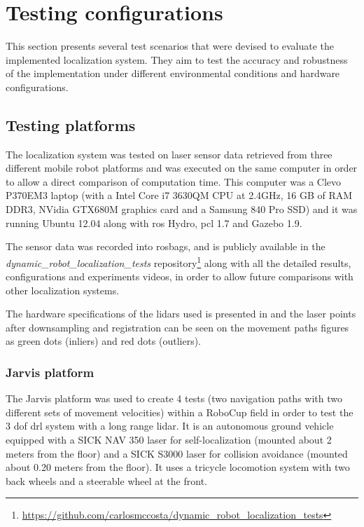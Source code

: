 \section{Testing configurations}\label{sec:testing-configurations}

This section presents several test scenarios that were devised to evaluate the implemented localization system. They aim to test the accuracy and robustness of the implementation under different environmental conditions and hardware configurations.


\subsection{Testing platforms}

The localization system was tested on laser sensor data retrieved from three different mobile robot platforms and was executed on the same computer in order to allow a direct comparison of computation time. This computer was a Clevo P370EM3 laptop (with a Intel Core i7 3630QM CPU at 2.4GHz, 16 GB of RAM DDR3, NVidia GTX680M graphics card and a Samsung 840 Pro SSD) and it was running Ubuntu 12.04 along with \gls{ros} Hydro, \gls{pcl} 1.7 and Gazebo 1.9.

The sensor data was recorded into rosbags, and is publicly available in the \emph{dynamic\_robot\_localization\_tests} repository\footnote{\url{https://github.com/carlosmccosta/dynamic_robot_localization_tests}} along with all the detailed results, configurations and experiments videos, in order to allow future comparisons with other localization systems.

The hardware specifications of the \glspl{lidar} used is presented in  and the laser points after downsampling and registration can be seen on the movement paths figures as green dots (inliers) and red dots (outliers).


\subsubsection{Jarvis platform}

The Jarvis platform was used to create 4 tests (two navigation paths with two different sets of movement velocities) within a RoboCup field in order to test the 3 \gls{dof} \gls{drl} system with a long range \gls{lidar}. It is an autonomous ground vehicle equipped with a SICK NAV 350 laser for self-localization (mounted about 2 meters from the floor) and a SICK S3000 laser for collision avoidance (mounted about 0.20 meters from the floor). It uses a tricycle locomotion system with two back wheels and a steerable wheel at the front.

